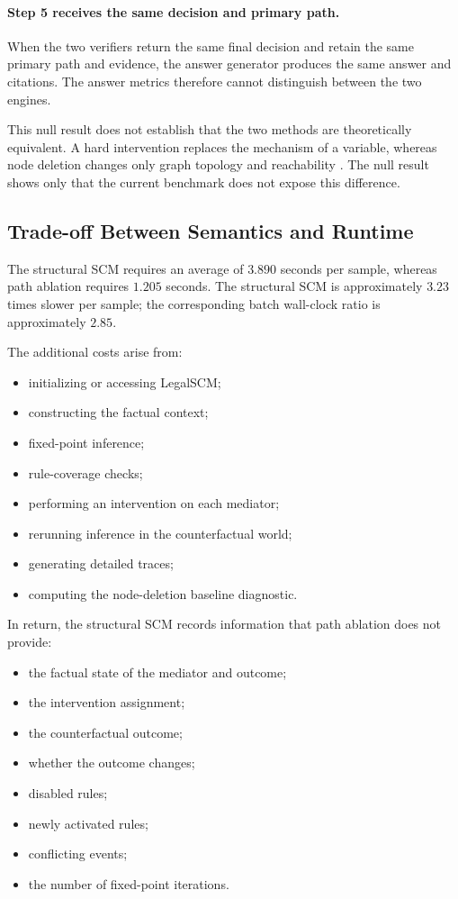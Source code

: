 \paragraph{Step 5 receives the same decision and primary path.}

When the two verifiers return the same final decision and retain the same
primary path and evidence, the answer generator produces the same answer and
citations. The answer metrics therefore cannot distinguish between the two
engines.

This null result does not establish that the two methods are theoretically
equivalent. A hard intervention replaces the mechanism of a variable,
whereas node deletion changes only graph topology and reachability
\cite{pearl2009causality}. The null result shows only that the current
benchmark does not expose this difference.

\subsection{Trade-off Between Semantics and Runtime}

The structural SCM requires an average of \(3.890\) seconds per sample,
whereas path ablation requires \(1.205\) seconds. The structural SCM is
approximately \(3.23\) times slower per sample; the corresponding batch
wall-clock ratio is approximately \(2.85\).

The additional costs arise from:

\begin{itemize}
    \item initializing or accessing LegalSCM;
    \item constructing the factual context;
    \item fixed-point inference;
    \item rule-coverage checks;
    \item performing an intervention on each mediator;
    \item rerunning inference in the counterfactual world;
    \item generating detailed traces;
    \item computing the node-deletion baseline diagnostic.
\end{itemize}

In return, the structural SCM records information that path ablation does not
provide:

\begin{itemize}
    \item the factual state of the mediator and outcome;
    \item the intervention assignment;
    \item the counterfactual outcome;
    \item whether the outcome changes;
    \item disabled rules;
    \item newly activated rules;
    \item conflicting events;
    \item the number of fixed-point iterations.
\end{itemize}

